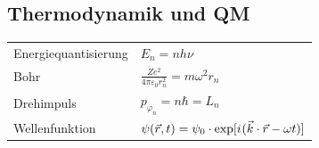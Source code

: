 \documentclass[12pt,a4paper]{article}
\newcommand{\iu}{{i\mkern1mu}}
\renewcommand{\=}[1]{\stackrel{#1}{=}}
\newcommand{\ort}{\vec r}
\theoremstyle{definition}
\theoremstyle{remark}
\begin{document}
\begin{center}
\begin{minipage}[t]{.45\linewidth}
\vspace{0pt}
\noindent\begin{tabular}{ll}
\toprule



\bottomrule
\end{tabular}
\end{minipage}%
\hspace{0.02\linewidth}
\begin{minipage}[t]{.45\linewidth}
\vspace{0pt}
\begin{tabular}{ll}
\toprule


\end{tabular}
\end{minipage}
\end{center}














\subsection{Thermodynamik und QM}

\begin{center}
\begin{minipage}[t]{.35\linewidth}
\vspace{0pt}
\noindent\begin{tabular}{ll}
\toprule

Energiequantisierung &  $E_n = nh\nu$\\
Bohr &  $\frac{Ze^2}{4\pi \varepsilon_0 r_n^2} = m \omega^2 r_n$\\
Drehimpuls &  $p_{\varphi_n} = n \hbar = L_n$\\
Wellenfunktion & $\psi(\ort, t) = \psi_0 \cdot \exp[\iu (\vec k \cdot \ort - \omega t)]$\\

\bottomrule
\end{tabular}
\end{minipage}%
\begin{minipage}[t]{.65\linewidth}
\vspace{0pt}
\begin{tabular}{ll}
\toprule


\end{tabular}
\end{minipage}
\end{center}
\end{document}
